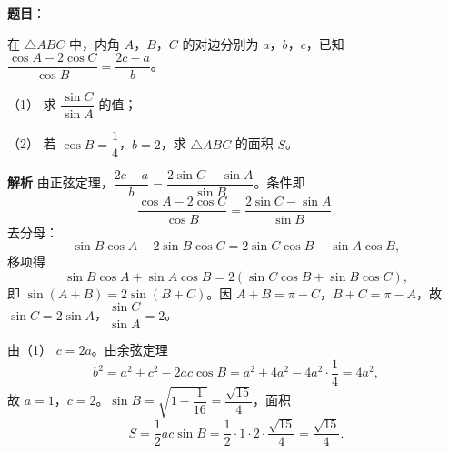 \begin{answer}

\textbf{题目}：

在 $\triangle ABC$ 中，内角 $A$，$B$，$C$ 的对边分别为 $a$，$b$，$c$，已知 $\dfrac{\cos A-2\cos C}{\cos B}=\dfrac{2c-a}{b}$。

（1） 求 $\dfrac{\sin C}{\sin A}$ 的值；

（2） 若 $\cos B=\dfrac14$，$b=2$，求 $\triangle ABC$ 的面积 $S$。

\textbf{解析}
由正弦定理，$\dfrac{2c-a}{b}=\dfrac{2\sin C-\sin A}{\sin B}$。条件即
\nopagebreak[4]
\[\frac{\cos A-2\cos C}{\cos B}=\frac{2\sin C-\sin A}{\sin B}.\]
去分母：
\nopagebreak[4]
\[\sin B\cos A-2\sin B\cos C=2\sin C\cos B-\sin A\cos B,\]
移项得
\nopagebreak[4]
\[\sin B\cos A+\sin A\cos B=2(\sin C\cos B+\sin B\cos C),\]
即 $\sin(A+B)=2\sin(B+C)$。因 $A+B=\pi-C$，$B+C=\pi-A$，故 $\sin C=2\sin A$，$\dfrac{\sin C}{\sin A}=2$。

由（1） $c=2a$。由余弦定理
\nopagebreak[4]
\[b^2=a^2+c^2-2ac\cos B=a^2+4a^2-4a^2\cdot\frac14=4a^2,\]
故 $a=1$，$c=2$。$\sin B=\sqrt{1-\dfrac1{16}}=\dfrac{\sqrt{15}}4$，面积
\nopagebreak[4]
\[S=\frac12ac\sin B=\frac12\cdot1\cdot2\cdot\frac{\sqrt{15}}4=\frac{\sqrt{15}}4.\]



\end{answer}
